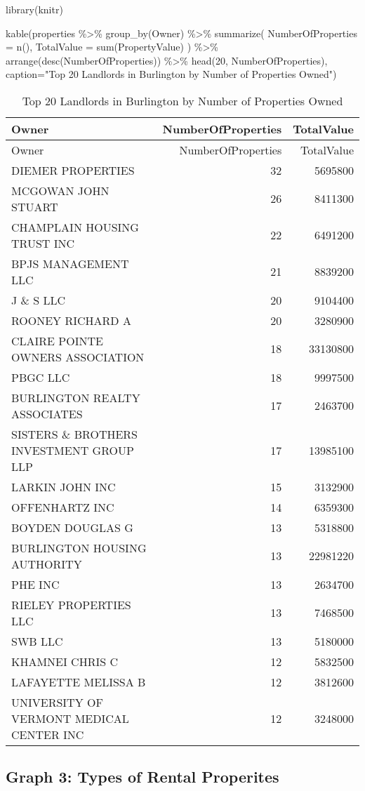 \documentclass[
]{article}
\newenvironment{Shaded}{\begin{snugshade}}{\end{snugshade}}
\newcommand{\AttributeTok}[1]{\textcolor[rgb]{0.77,0.63,0.00}{#1}}
\newcommand{\DecValTok}[1]{\textcolor[rgb]{0.00,0.00,0.81}{#1}}
\newcommand{\FunctionTok}[1]{\textcolor[rgb]{0.00,0.00,0.00}{#1}}
\newcommand{\NormalTok}[1]{#1}
\newcommand{\SpecialCharTok}[1]{\textcolor[rgb]{0.00,0.00,0.00}{#1}}
\newcommand{\StringTok}[1]{\textcolor[rgb]{0.31,0.60,0.02}{#1}}
\begin{document}
\begin{Shaded}
\begin{Highlighting}[]
\FunctionTok{library}\NormalTok{(knitr)}

\FunctionTok{kable}\NormalTok{(properties }\SpecialCharTok{\%\textgreater{}\%}
  \FunctionTok{group\_by}\NormalTok{(Owner) }\SpecialCharTok{\%\textgreater{}\%}
  \FunctionTok{summarize}\NormalTok{(}
    \AttributeTok{NumberOfProperties =} \FunctionTok{n}\NormalTok{(),}
    \AttributeTok{TotalValue =} \FunctionTok{sum}\NormalTok{(PropertyValue)}
\NormalTok{  ) }\SpecialCharTok{\%\textgreater{}\%} 
  \FunctionTok{arrange}\NormalTok{(}\FunctionTok{desc}\NormalTok{(NumberOfProperties)) }\SpecialCharTok{\%\textgreater{}\%} 
  \FunctionTok{head}\NormalTok{(}\DecValTok{20}\NormalTok{, NumberOfProperties), }\AttributeTok{caption=}\StringTok{"Top 20 Landlords in Burlington by Number of Properties Owned"}\NormalTok{)}
\end{Highlighting}
\end{Shaded}

\begin{longtable}[]{@{}lrr@{}}
\caption{Top 20 Landlords in Burlington by Number of Properties
Owned}\tabularnewline
\toprule
Owner & NumberOfProperties & TotalValue\tabularnewline
\midrule
\endfirsthead
\toprule
Owner & NumberOfProperties & TotalValue\tabularnewline
\midrule
\endhead
DIEMER PROPERTIES & 32 & 5695800\tabularnewline
MCGOWAN JOHN STUART & 26 & 8411300\tabularnewline
CHAMPLAIN HOUSING TRUST INC & 22 & 6491200\tabularnewline
BPJS MANAGEMENT LLC & 21 & 8839200\tabularnewline
J \& S LLC & 20 & 9104400\tabularnewline
ROONEY RICHARD A & 20 & 3280900\tabularnewline
CLAIRE POINTE OWNERS ASSOCIATION & 18 & 33130800\tabularnewline
PBGC LLC & 18 & 9997500\tabularnewline
BURLINGTON REALTY ASSOCIATES & 17 & 2463700\tabularnewline
SISTERS \& BROTHERS INVESTMENT GROUP LLP & 17 & 13985100\tabularnewline
LARKIN JOHN INC & 15 & 3132900\tabularnewline
OFFENHARTZ INC & 14 & 6359300\tabularnewline
BOYDEN DOUGLAS G & 13 & 5318800\tabularnewline
BURLINGTON HOUSING AUTHORITY & 13 & 22981220\tabularnewline
PHE INC & 13 & 2634700\tabularnewline
RIELEY PROPERTIES LLC & 13 & 7468500\tabularnewline
SWB LLC & 13 & 5180000\tabularnewline
KHAMNEI CHRIS C & 12 & 5832500\tabularnewline
LAFAYETTE MELISSA B & 12 & 3812600\tabularnewline
UNIVERSITY OF VERMONT MEDICAL CENTER INC & 12 & 3248000\tabularnewline
\bottomrule
\end{longtable}

\hypertarget{graph-3-types-of-rental-properites}{%
\subsection{Graph 3: Types of Rental
Properites}\label{graph-3-types-of-rental-properites}}
\end{document}
